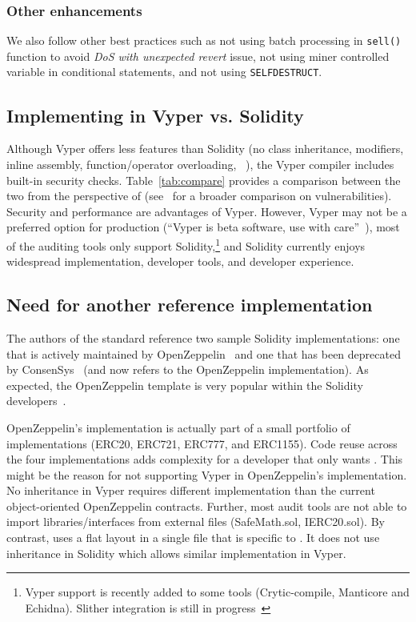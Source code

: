 \subsubsection{Other enhancements}
We also follow other best practices such as not using batch processing in \texttt{sell()} function to avoid \textit{DoS with unexpected revert} issue, not using miner controlled variable in conditional statements, and not using \texttt{SELFDESTRUCT}.

\subsection{Implementing in Vyper vs. Solidity}
Although Vyper offers less features than Solidity (\eg no class inheritance, modifiers, inline assembly, function/operator overloading, \etc~\cite{SolidityDoc}), the Vyper compiler includes built-in security checks. Table~\ref{tab:compare} provides a comparison between the two from the perspective of \sys (see~\cite{Vyper1} for a broader comparison on vulnerabilities). Security and performance are advantages of Vyper. However, Vyper may not be a preferred option for production (``Vyper is beta software, use with care''~\cite{VyperReadme}), most of the auditing tools only support Solidity,\footnote{Vyper support is recently added to some tools (\eg Crytic-compile, Manticore and Echidna). Slither integration is still in progress~\cite{Crytic}} and Solidity currently enjoys widespread  implementation, developer tools, and developer experience.


	
\subsection{Need for another reference implementation}
The authors of the \erc standard reference two sample Solidity implementations: one that is actively maintained by OpenZeppelin~\cite{OpenZepplin} and one that has been deprecated by ConsenSys~\cite{ConsensysToken} (and now refers to the OpenZeppelin implementation). As expected, the OpenZeppelin template is very popular within the Solidity developers~\cite{OPZ1,OPZ2,OPZ3}.

OpenZeppelin's implementation is actually part of a small portfolio of implementations (ERC20, ERC721, ERC777, and ERC1155). Code reuse across the four implementations adds complexity for a developer that only wants \erc. This might be the reason for not supporting Vyper in OpenZeppelin's implementation. No inheritance in Vyper requires different implementation than the current object-oriented OpenZeppelin contracts. Further, most audit tools are not able to import libraries/interfaces from external files (\eg SafeMath.sol, IERC20.sol). By contrast, \sys uses a flat layout in a single file that is specific to \erc. It does not use inheritance in Solidity which allows similar implementation in Vyper.  

